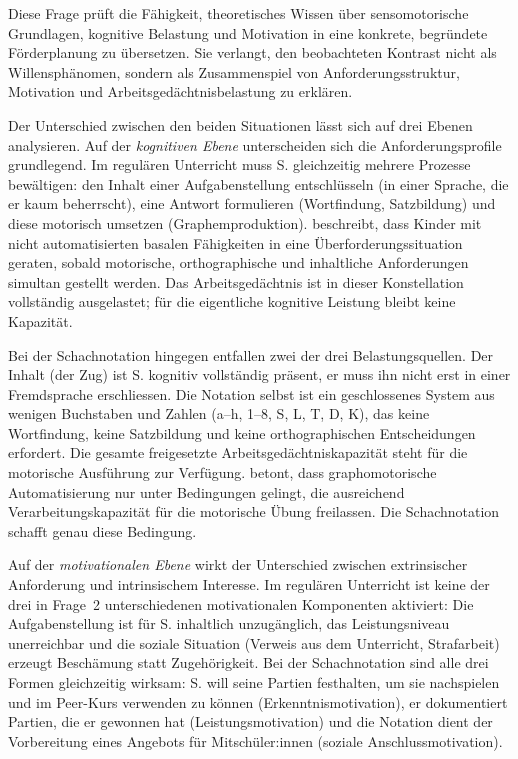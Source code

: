 \documentclass[ngerman, a4paper]{article}
\begin{document}
Diese Frage prüft die Fähigkeit, theoretisches Wissen über sensomotorische
Grundlagen, kognitive Belastung und Motivation in eine konkrete, begründete
Förderplanung zu übersetzen. Sie verlangt, den beobachteten Kontrast nicht als
Willensphänomen, sondern als Zusammenspiel von Anforderungsstruktur, Motivation
und Arbeitsgedächtnisbelastung zu erklären.

Der Unterschied zwischen den beiden Situationen lässt sich auf drei Ebenen
analysieren. Auf der \textit{kognitiven Ebene} unterscheiden sich die
Anforderungsprofile grundlegend. Im regulären Unterricht muss S. gleichzeitig
mehrere Prozesse bewältigen: den Inhalt einer Aufgabenstellung entschlüsseln
(in einer Sprache, die er kaum beherrscht), eine Antwort formulieren
(Wortfindung, Satzbildung) und diese motorisch umsetzen (Graphemproduktion).
\textcite[Kap.\,1--4]{gold2018lesenkannmanlernen} beschreibt, dass Kinder mit nicht automatisierten basalen Fähigkeiten in
eine Überforderungssituation geraten, sobald motorische, orthographische und
inhaltliche Anforderungen simultan gestellt werden. Das Arbeitsgedächtnis ist
in dieser Konstellation vollständig ausgelastet; für die eigentliche kognitive
Leistung bleibt keine Kapazität.

Bei der Schachnotation hingegen entfallen zwei der drei Belastungsquellen. Der
Inhalt (der Zug) ist S. kognitiv vollständig präsent, er muss ihn nicht erst
in einer Fremdsprache erschliessen. Die Notation selbst ist ein geschlossenes
System aus wenigen Buchstaben und Zahlen (a--h, 1--8, S, L, T, D, K), das keine
Wortfindung, keine Satzbildung und keine orthographischen Entscheidungen
erfordert. Die gesamte freigesetzte Arbeitsgedächtniskapazität steht für die
motorische Ausführung zur Verfügung. \textcite[S.\,2--4]{sturm2016graphomotorik} betont, dass graphomotorische
Automatisierung nur unter Bedingungen gelingt, die ausreichend
Verarbeitungskapazität für die motorische Übung freilassen. Die Schachnotation
schafft genau diese Bedingung.

Auf der \textit{motivationalen Ebene} wirkt der Unterschied zwischen extrinsischer
Anforderung und intrinsischem Interesse. Im regulären Unterricht ist
keine der drei in Frage~2 unterschiedenen motivationalen Komponenten
aktiviert: Die Aufgabenstellung ist für S. inhaltlich
unzugänglich, das Leistungsniveau unerreichbar und die soziale Situation (Verweis
aus dem Unterricht, Strafarbeit) erzeugt Beschämung statt Zugehörigkeit. Bei der
Schachnotation sind alle drei Formen gleichzeitig wirksam: S. will seine Partien
festhalten, um sie nachspielen und im Peer-Kurs verwenden zu können
(Erkenntnismotivation), er dokumentiert Partien, die er gewonnen hat
(Leistungsmotivation) und die Notation dient der Vorbereitung eines Angebots
für Mitschüler:innen (soziale Anschlussmotivation).
\end{document}
